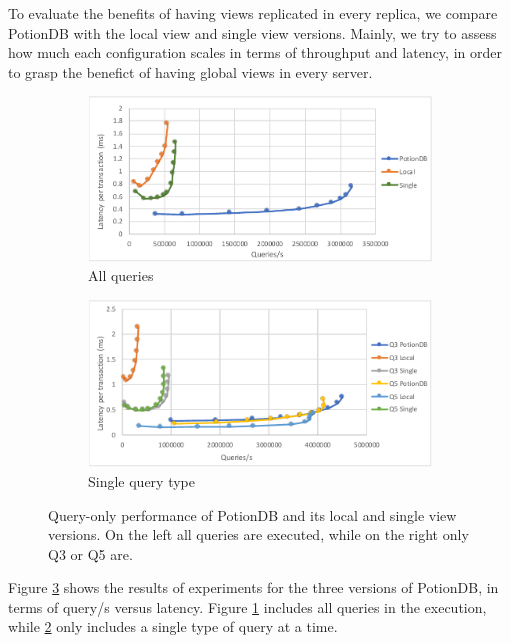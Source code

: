 \documentclass{vldb}
\begin{document}
To evaluate the benefits of having views replicated in every replica, we compare PotionDB with the local view and single view versions.
Mainly, we try to assess how much each configuration scales in terms of throughput and latency, in order to grasp the benefict of having global views in every server.

\begin{figure}
	\centering
	\begin{subfigure}{.5\linewidth}
		\centering
		\includegraphics[width=.95\linewidth]{clientScale_cut}
		\caption{All queries}
		\label{fig:global_local_single}
	\end{subfigure}%
	\begin{subfigure}{.5\linewidth}
		\centering
		\includegraphics[width=.95\linewidth]{Q3vsQ5_cut}
		\caption{Single query type}
		\label{fig:q3q5}
	\end{subfigure}
	\caption{Query-only performance of PotionDB and its local and single view versions. On the left all queries are executed, while on the right only Q3 or Q5 are.}
	\label{fig:query_only}
\end{figure}

Figure \ref{fig:query_only} shows the results of experiments for the three versions of PotionDB, in terms of query/s versus latency.
Figure \ref{fig:global_local_single} includes all queries in the execution, while \ref{fig:q3q5} only includes a single type of query at a time.
\end{document}
